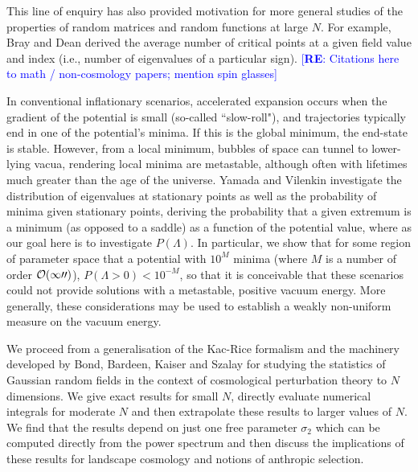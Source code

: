 \documentclass[12pt]{article}
\newcommand{\re}[1]{\textcolor{blue}{[{\bf RE}: #1]}}
\begin{document}
This line of enquiry has also provided motivation for more general studies of the properties of random matrices and random functions at large $N$. For example,  Bray and Dean derived the average number of critical points at a given field value and index (i.e., number of eigenvalues of a particular sign).\cite{Bray2007,Dean2008,Majumdar2009,Bachlechner2014,Battefeld2012,Fyodorov2013,Masoumi2017} \re{Citations here to math / non-cosmology papers; mention spin glasses}


In conventional inflationary scenarios, accelerated expansion occurs when the gradient of the potential is small (so-called ``slow-roll"), and trajectories typically end in one of the potential's minima. If this is the global minimum, the end-state is stable. However, from  a local minimum, bubbles of space can tunnel to lower-lying vacua, rendering local minima are metastable, although often with lifetimes much greater than the age of the universe.  Yamada and Vilenkin \cite{Yamada2018} investigate the distribution of eigenvalues at stationary points as well as the probability of minima given stationary points, deriving the probability that a given extremum is a minimum (as opposed to a saddle) as a function of the potential value, where as our goal here is to investigate $P(\Lambda)$. In particular, we show that for some region of parameter space that a potential with $10^M$ minima (where $M$ is a number of order ${\cal{O}(100)}$), $P(\Lambda > 0) < 10^{-M}$, so that it is conceivable that these scenarios could not provide solutions with a metastable, positive vacuum energy. More generally, these considerations may be used to establish a weakly non-uniform measure on the vacuum energy. 

We proceed from a generalisation of the Kac-Rice formalism \cite{Kac1943,Rice1945} and the  machinery developed by Bond, Bardeen, Kaiser and Szalay  \cite{BBKS}  for studying the statistics of Gaussian random fields in the context of cosmological perturbation theory   to $N$ dimensions. We give exact results for small $N$, directly evaluate numerical integrals for moderate $N$ and then extrapolate these results to larger values of $N$. We find that the results depend on just one free parameter $\sigma_2$ which can be computed directly from the power spectrum and then discuss the implications of these results for landscape cosmology and notions of anthropic selection. 
\end{document}
